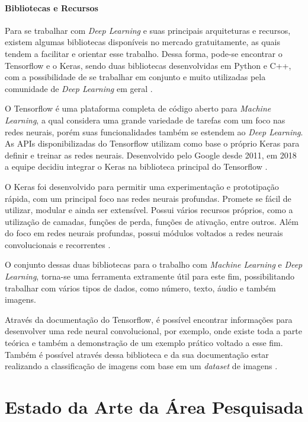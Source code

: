 \subsubsection{Bibliotecas e Recursos}
Para se trabalhar com \emph{Deep Learning} e suas principais arquiteturas e recursos, existem algumas bibliotecas disponíveis no mercado gratuitamente, as quais tendem a facilitar e orientar esse trabalho. Dessa forma, pode-se encontrar o Tensorflow e o Keras, sendo duas bibliotecas desenvolvidas em Python e C++, com a possibilidade de se trabalhar em conjunto e muito utilizadas pela comunidade de \emph{Deep Learning} em geral \cite{deepLearningTensorFlow}.

O Tensorflow é uma plataforma completa de código aberto para \emph{Machine Learning}, a qual considera uma grande variedade de tarefas com um foco nas redes neurais, porém suas funcionalidades também se estendem ao \emph{Deep Learning}. As APIs disponibilizadas do Tensorflow utilizam como base o próprio Keras para definir e treinar as redes neurais. Desenvolvido pelo Google desde 2011, em 2018 a equipe decidiu integrar o Keras na biblioteca principal do Tensorflow \cite{websiteTensorFlow}.

O Keras foi desenvolvido para permitir uma experimentação e prototipação rápida, com um principal foco nas redes neurais profundas. Promete se fácil de utilizar, modular e ainda ser extensível. Possui vários recursos próprios, como a utilização de camadas, funções de perda, funções de ativação, entre outros. Além do foco em redes neurais profundas, possui módulos voltados a redes neurais convolucionais e recorrentes \cite{websiteKeras}.

O conjunto dessas duas bibliotecas para o trabalho com \emph{Machine Learning} e \emph{Deep Learning}, torna-se uma ferramenta extramente útil para este fim, possibilitando trabalhar com vários tipos de dados, como número, texto, áudio e também imagens.

Através da documentação do Tensorflow, é possível encontrar informações para desenvolver uma rede neural convolucional, por exemplo, onde existe toda a parte teórica e também a demonstração de um exemplo prático voltado a esse fim. Também é possível através dessa biblioteca e da sua documentação estar realizando a classificação de imagens com base em um \emph{dataset} de imagens \cite{websiteTensorFlow}.

\chapter{Estado da Arte da Área Pesquisada}
\label{chap:mapeamento}

